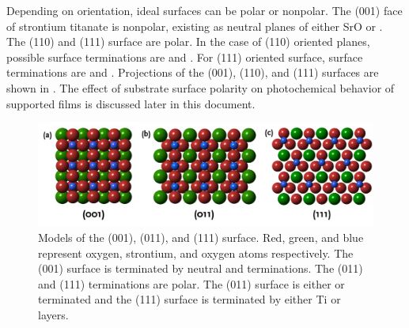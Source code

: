 Depending on orientation, ideal  surfaces can be polar or nonpolar. The (001)
face of strontium titanate is nonpolar, existing as neutral planes of either SrO or
. The (110) and (111) surface are polar. In the case of (110) oriented planes,
possible surface terminations are  and . For (111) oriented
surface, surface terminations are  and . Projections of the
(001), (110), and (111) surfaces are shown in . The effect of
substrate surface polarity on photochemical behavior of supported films is discussed later
in this document.

\begin{figure}
	\includegraphics[width=\textwidth]{stoterms.pdf}
		\caption[Low-index  surface terminations]{%
			Models of the  (001), (011), and (111) surface. 
			Red, green, and blue represent oxygen, strontium, and oxygen 
			atoms respectively. The (001) surface is terminated by neutral 
			 and  terminations. The (011) and (111) 
			terminations are polar. The (011) surface is either  
			or  terminated and the (111) surface is terminated by 
			either Ti or  layers.}
	\label{fig:stoterms}
\end{figure}

